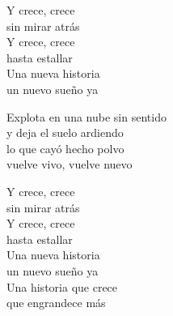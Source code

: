 \begin{lyrics}
Y crece, crece\\
sin mirar atrás\\
Y crece, crece\\
hasta estallar\\
Una nueva historia\\
un nuevo sueño ya

Explota en una nube sin sentido\\
y deja el suelo ardiendo\\
lo que cayó hecho polvo\\
vuelve vivo, vuelve nuevo

Y crece, crece\\
sin mirar atrás\\
Y crece, crece\\
hasta estallar\\
Una nueva historia\\
un nuevo sueño ya\\
Una historia que crece\\
que engrandece más
\end{lyrics}

